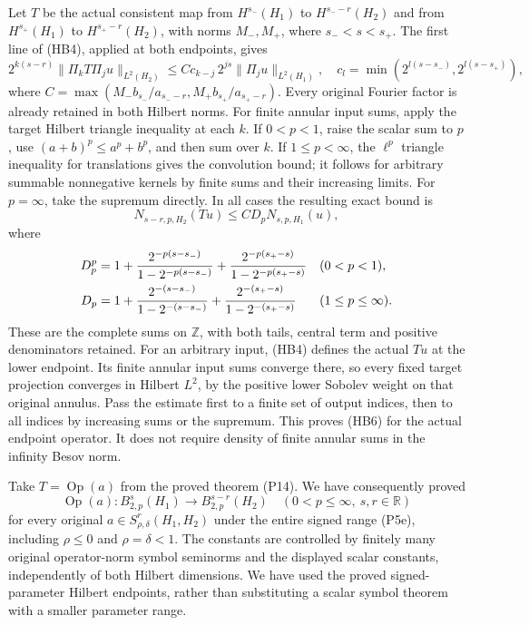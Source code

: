 \documentclass[
  11pt,
]{article}
\begin{document}
Let \(T\) be the actual consistent map from \(H^{s_-}(H_1)\) to
\(H^{s_--r}(H_2)\) and from \(H^{s_+}(H_1)\) to \(H^{s_+-r}(H_2)\), with
norms \(M_-,M_+\), where \(s_-<s<s_+\). The first line of (HB4), applied
at both endpoints, gives \[
2^{k(s-r)}\|\Pi_kT\Pi_ju\|_{L^2(H_2)}
\le Cc_{k-j}\,2^{js}\|\Pi_ju\|_{L^2(H_1)},
\quad c_l=\min(2^{l(s-s_-)},2^{l(s-s_+)}),
\tag{HB5}
\] where \(C=\max(M_-b_{s_-}/a_{s_--r},M_+b_{s_+}/a_{s_+-r})\). Every
original Fourier factor is already retained in both Hilbert norms. For
finite annular input sums, apply the target Hilbert triangle inequality
at each \(k\). If \(0<p<1\), raise the scalar sum to \(p\), use
\((a+b)^p\le a^p+b^p\), and then sum over \(k\). If \(1\le p<\infty\),
the \(\ell^p\) triangle inequality for translations gives the
convolution bound; it follows for arbitrary summable nonnegative kernels
by finite sums and their increasing limits. For \(p=\infty\), take the
supremum directly. In all cases the resulting exact bound is \[
N_{s-r,p,H_2}(Tu)\le C D_p N_{s,p,H_1}(u),
\tag{HB6}
\] where \[
\begin{aligned}
D_p^p&=1+{2^{-p(s-s_-)}\over1-2^{-p(s-s_-)}}
          +{2^{-p(s_+-s)}\over1-2^{-p(s_+-s)}}&& (0<p<1),\\
D_p&=1+{2^{-(s-s_-)}\over1-2^{-(s-s_-)}}
          +{2^{-(s_+-s)}\over1-2^{-(s_+-s)}}&& (1\le p\le\infty).
\end{aligned}
\] These are the complete sums on \(\mathbb Z\), with both tails,
central term and positive denominators retained. For an arbitrary input,
(HB4) defines the actual \(Tu\) at the lower endpoint. Its finite
annular input sums converge there, so every fixed target projection
converges in Hilbert \(L^2\), by the positive lower Sobolev weight on
that original annulus. Pass the estimate first to a finite set of output
indices, then to all indices by increasing sums or the supremum. This
proves (HB6) for the actual endpoint operator. It does not require
density of finite annular sums in the infinity Besov norm.

Take \(T=\operatorname{Op}(a)\) from the proved theorem (P14). We have
consequently proved \[
\operatorname{Op}(a):B^s_{2,p}(H_1)\longrightarrow B^{s-r}_{2,p}(H_2)
\quad(0<p\le\infty,\ s,r\in\mathbb R)
\tag{HB7}
\] for every original \(a\in S^r_{\rho,\delta}(H_1,H_2)\) under the
entire signed range (P5e), including \(\rho\le0\) and \(\rho=\delta<1\).
The constants are controlled by finitely many original operator-norm
symbol seminorms and the displayed scalar constants, independently of
both Hilbert dimensions. We have used the proved signed-parameter
Hilbert endpoints, rather than substituting a scalar symbol theorem with
a smaller parameter range.
\end{document}
